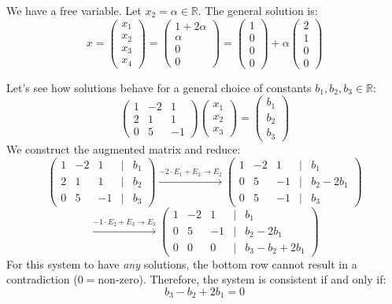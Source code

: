 \begin{example}
We have a free variable. Let $x_2 = \alpha \in \mathbb{R}$. The general solution is:
\[
x = \begin{pmatrix} x_1 \\ x_2 \\ x_3 \\ x_4 \end{pmatrix} = \begin{pmatrix} 1 + 2\alpha \\ \alpha \\ 0 \\ 0 \end{pmatrix} = \begin{pmatrix} 1 \\ 0 \\ 0 \\ 0 \end{pmatrix} + \alpha \begin{pmatrix} 2 \\ 1 \\ 0 \\ 0 \end{pmatrix}
\]
\end{example}

\begin{example}
Let's see how solutions behave for a general choice of constants $b_1, b_2, b_3 \in \mathbb{R}$:
\[
\begin{pmatrix}
1 & -2 & 1 \\
2 & 1 & 1 \\
0 & 5 & -1 
\end{pmatrix}
\begin{pmatrix} x_1 \\ x_2 \\ x_3 \end{pmatrix}
= \begin{pmatrix} b_1 \\ b_2 \\ b_3 \end{pmatrix}
\]
We construct the augmented matrix and reduce:
\[
\begin{pmatrix}
1 & -2 & 1 & \big| & b_1 \\
2 & 1 & 1 & \big| & b_2 \\
0 & 5 & -1 & \big| & b_3 
\end{pmatrix}
\xrightarrow{-2 \cdot E_1 + E_2 \to E_2}
\begin{pmatrix}
1 & -2 & 1 & \big| & b_1 \\
0 & 5 & -1 & \big| & b_2 - 2b_1 \\
0 & 5 & -1 & \big| & b_3 
\end{pmatrix}
\]
\[
\xrightarrow{-1 \cdot E_2 + E_3 \to E_3}
\begin{pmatrix}
1 & -2 & 1 & \big| & b_1 \\
0 & 5 & -1 & \big| & b_2 - 2b_1 \\
0 & 0 & 0 & \big| & b_3 - b_2 + 2b_1 
\end{pmatrix}
\]
For this system to have \textit{any} solutions, the bottom row cannot result in a contradiction ($0 = \text{non-zero}$). Therefore, the system is consistent if and only if:
\[
b_3 - b_2 + 2b_1 = 0
\]
\end{example}